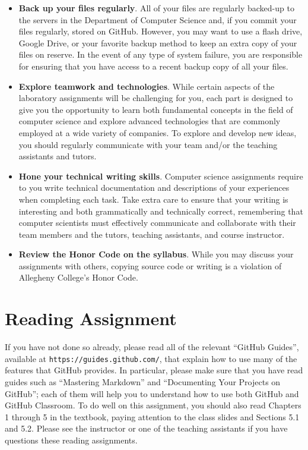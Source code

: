\documentclass[11pt]{article}
\newcommand{\url}[1]{\lstinline{#1}}
\begin{document}
\begin{itemize}
\item {\bf Back up your files regularly}. All of your files are regularly backed-up to the servers in the Department of
  Computer Science and, if you commit your files regularly, stored on GitHub. However, you may want to use a flash
  drive, Google Drive, or your favorite backup method to keep an extra copy of your files on reserve. In the event of
  any type of system failure, you are responsible for ensuring that you have access to a recent backup copy of all your
  files.

\item {\bf Explore teamwork and technologies}. While certain aspects of the laboratory assignments will be challenging
  for you, each part is designed to give you the opportunity to learn both fundamental concepts in the field of computer
  science and explore advanced technologies that are commonly employed at a wide variety of companies. To explore and
  develop new ideas, you should regularly communicate with your team and/or the teaching assistants and tutors.

\item {\bf Hone your technical writing skills}. Computer science assignments require to you write technical
  documentation and descriptions of your experiences when completing each task. Take extra care to ensure that your
  writing is interesting and both grammatically and technically correct, remembering that computer scientists must
  effectively communicate and collaborate with their team members and the tutors, teaching assistants, and course
  instructor.

\item {\bf Review the Honor Code on the syllabus}. While you may discuss your assignments with others, copying source
  code or writing is a violation of Allegheny College's Honor Code.

\end{itemize}

\section*{Reading Assignment}

If you have not done so already, please read all of the relevant ``GitHub
Guides'', available at \url{https://guides.github.com/}, that explain how to use
many of the features that GitHub provides. In particular, please make sure that
you have read guides such as ``Mastering Markdown'' and ``Documenting Your
Projects on GitHub''; each of them will help you to understand how to use both
GitHub and GitHub Classroom. To do well on this assignment, you should also read
Chapters 1 through 5 in the textbook, paying attention to the class slides and
Sections 5.1 and 5.2. Please see the instructor or one of the teaching
assistants if you have questions these reading assignments.
\end{document}
